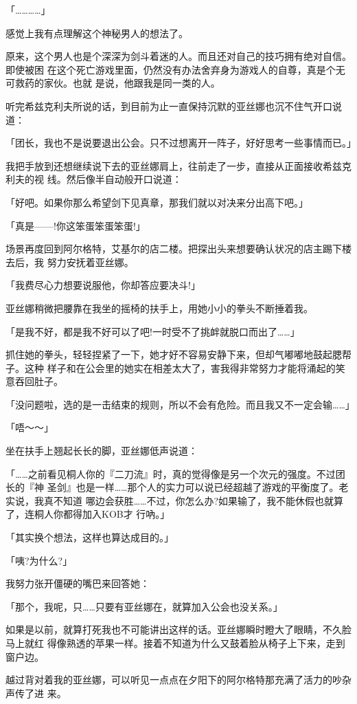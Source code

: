 \documentclass[11pt]{book}
\begin{document}
「…………」

感觉上我有点理解这个神秘男人的想法了。

原来，这个男人也是个深深为剑斗着迷的人。而且还对自己的技巧拥有绝对自信。即使被困
在这个死亡游戏里面，仍然没有办法舍弃身为游戏人的自尊，真是个无可救药的家伙。也就
是说，他跟我是同一类的人。

听完希兹克利夫所说的话，到目前为止一直保持沉默的亚丝娜也沉不住气开口说道：

「团长，我也不是说要退出公会。只不过想离开一阵子，好好思考一些事情而已。」

我把手放到还想继续说下去的亚丝娜肩上，往前走了一步，直接从正面接收希兹克利夫的视
线。然后像半自动般开口说道：

「好吧。如果你那么希望剑下见真章，那我们就以对决来分出高下吧。」

「真是——!你这笨蛋笨蛋笨蛋!」

场景再度回到阿尔格特，艾基尔的店二楼。把探出头来想要确认状况的店主踢下楼去后，我
努力安抚着亚丝娜。

「我费尽心力想要说服他，你却答应要决斗!」

亚丝娜稍微把腰靠在我坐的摇椅的扶手上，用她小小的拳头不断捶着我。

「是我不好，都是我不好可以了吧!一时受不了挑衅就脱口而出了……」

抓住她的拳头，轻轻捏紧了一下，她才好不容易安静下来，但却气嘟嘟地鼓起腮帮子。这种
样子和在公会里的她实在相差太大了，害我得非常努力才能将涌起的笑意吞回肚子。

「没问题啦，选的是一击结束的规则，所以不会有危险。而且我又不一定会输……」

「唔～～」

坐在扶手上翘起长长的脚，亚丝娜低声说道：

「……之前看见桐人你的『二刀流』时，真的觉得像是另一个次元的强度。不过团长的『神
圣剑』也是一样……那个人的实力可以说已经超越了游戏的平衡度了。老实说，我真不知道
哪边会获胜……不过，你怎么办?如果输了，我不能休假也就算了，连桐人你都得加入KOB才
行吶。」

「其实换个想法，这样也算达成目的。」

「咦?为什么?」

我努力张开僵硬的嘴巴来回答她：

「那个，我呢，只……只要有亚丝娜在，就算加入公会也没关系。」

如果是以前，就算打死我也不可能讲出这样的话。亚丝娜瞬时瞪大了眼睛，不久脸马上就红
得像熟透的苹果一样。接着不知道为什么又鼓着脸从椅子上下来，走到窗户边。

越过背对着我的亚丝娜，可以听见一点点在夕阳下的阿尔格特那充满了活力的吵杂声传了进
来。
\end{document}
